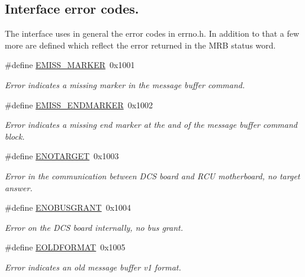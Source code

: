 \subsection*{Interface error codes.}
The interface uses in general the error codes in errno.h. In addition to that a few more are defined which reflect the error returned in the MRB status word. \begin{CompactItemize}
\item 
\#define \hyperlink{group__dcsc__msg__buffer__access_g2a64137d0941a60d8a7c65c60cf270d1}{EMISS\_\-MARKER}~0x1001
\begin{CompactList}\small\item\em Error indicates a missing marker in the message buffer command. \item\end{CompactList}\item 
\#define \hyperlink{group__dcsc__msg__buffer__access_g0003c432c9b704625105bb7fda5e875e}{EMISS\_\-ENDMARKER}~0x1002
\begin{CompactList}\small\item\em Error indicates a missing end marker at the and of the message buffer command block. \item\end{CompactList}\item 
\#define \hyperlink{group__dcsc__msg__buffer__access_g784f97ba20855df7fdcfb165ba30ba4c}{ENOTARGET}~0x1003
\begin{CompactList}\small\item\em Error in the communication between DCS board and RCU motherboard, no target answer. \item\end{CompactList}\item 
\#define \hyperlink{group__dcsc__msg__buffer__access_g6a6e1cfe5a616e5424852a4519bd47a9}{ENOBUSGRANT}~0x1004
\begin{CompactList}\small\item\em Error on the DCS board internally, no bus grant. \item\end{CompactList}\item 
\#define \hyperlink{group__dcsc__msg__buffer__access_g78f0a660b0b99a94de586d9174999492}{EOLDFORMAT}~0x1005
\begin{CompactList}\small\item\em Error indicates an old message buffer v1 format. \item\end{CompactList}\end{CompactItemize}
